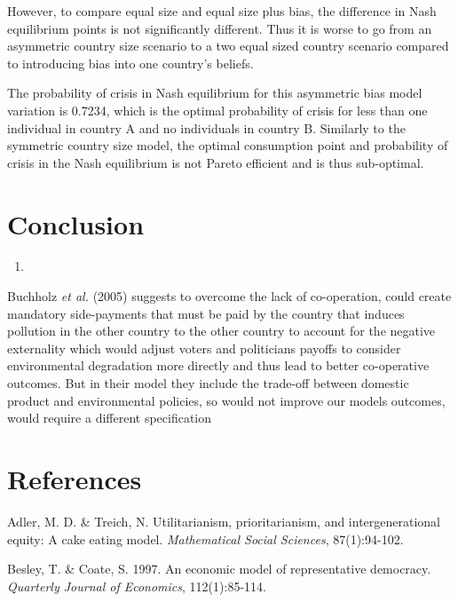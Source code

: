 \documentclass[11pt,preprint, authoryear]{elsarticle}
\numberwithin{equation}{section}
\numberwithin{figure}{section}
\numberwithin{table}{section}
\def\tightlist{} %
\begin{document}
However, to compare equal size and equal size plus bias, the difference
in Nash equilibrium points is not significantly different. Thus it is
worse to go from an asymmetric country size scenario to a two equal
sized country scenario compared to introducing bias into one country's
beliefs.

The probability of crisis in Nash equilibrium for this asymmetric bias
model variation is 0.7234, which is the optimal probability of crisis
for less than one individual in country A and no individuals in country
B. Similarly to the symmetric country size model, the optimal
consumption point and probability of crisis in the Nash equilibrium is
not Pareto efficient and is thus sub-optimal.

\hypertarget{conclusion}{%
\section{Conclusion}\label{conclusion}}

\begin{enumerate}
\def\labelenumi{(\arabic{enumi})}
\setcounter{enumi}{799}
\tightlist
\item
\end{enumerate}

Buchholz \emph{et al.} (2005) suggests to overcome the lack of
co-operation, could create mandatory side-payments that must be paid by
the country that induces pollution in the other country to the other
country to account for the negative externality which would adjust
voters and politicians payoffs to consider environmental degradation
more directly and thus lead to better co-operative outcomes. But in
their model they include the trade-off between domestic product and
environmental policies, so would not improve our models outcomes, would
require a different specification

\newpage

\hypertarget{references}{%
\section*{References}\label{references}}

Adler, M. D. \& Treich, N. Utilitarianism, prioritarianism, and
intergenerational equity: A cake eating model. \emph{Mathematical Social
Sciences}, 87(1):94-102.

Besley, T. \& Coate, S. 1997. An economic model of representative
democracy. \emph{Quarterly Journal of Economics}, 112(1):85-114.
\end{document}
